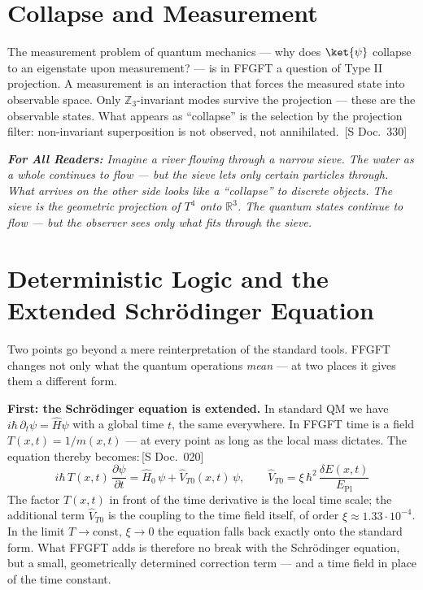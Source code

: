 \documentclass[11pt,oneside]{book}
\newcommand{\status}[1]{\penalty10000\,{\scriptsize\textcolor{gray!60}{[#1]}}}
\newenvironment{laierspur}{%
  \par\vspace{4pt}%
  \noindent\small\itshape\color{blue!60!black}%
  \textbf{For All Readers:}\enspace\ignorespaces}{%
  \par\vspace{4pt}\normalsize\normalfont\normalcolor}
\begin{document}
\section*{Collapse and Measurement}

The measurement problem of quantum mechanics — why does $\ket{\psi}$ collapse
to an eigenstate upon measurement? — is in FFGFT a question of Type II
projection. A measurement is an interaction that forces the measured state
into observable space. Only $\mathbb{Z}_3$-invariant modes survive the projection —
these are the observable states. What appears as \enquote{collapse} is the selection
by the projection filter: non-invariant superposition is not observed, not
annihilated. \status{S Doc.~330}

\begin{laierspur}
Imagine a river flowing through a narrow sieve. The water as a whole
continues to flow — but the sieve lets only certain particles through. What
arrives on the other side looks like a \enquote{collapse} to discrete objects. The
sieve is the geometric projection of $T^4$ onto $\mathbb{R}^3$. The quantum states
continue to flow — but the observer sees only what fits through the sieve.
\end{laierspur}

\section*{Deterministic Logic and the Extended Schrödinger Equation}

Two points go beyond a mere reinterpretation of the standard tools.
FFGFT changes not only what the quantum operations \textit{mean} ---
at two places it gives them a different form.

\textbf{First: the Schrödinger equation is extended.}
In standard QM we have $i\hbar\,\partial_t\psi = \hat{H}\psi$ with a
global time $t$, the same everywhere. In FFGFT time is a field
$T(x,t) = 1/m(x,t)$ --- at every point as long as the local mass dictates.
The equation thereby becomes:\status{S Doc.~020}
\[
  i\hbar\, T(x,t)\,\frac{\partial\psi}{\partial t}
  = \hat{H}_0\,\psi + \hat{V}_{T0}(x,t)\,\psi,
  \qquad
  \hat{V}_{T0} = \xi\,\hbar^2\,\frac{\delta E(x,t)}{E_{\mathrm{Pl}}}
\]
The factor $T(x,t)$ in front of the time derivative is the local time
scale; the additional term $\hat{V}_{T0}$ is the coupling to the time
field itself, of order $\xi \approx 1.33\cdot 10^{-4}$. In the limit
$T \to \mathrm{const}$, $\xi \to 0$ the equation falls back exactly onto
the standard form. What FFGFT adds is therefore no break with the
Schrödinger equation, but a small, geometrically determined correction
term --- and a time field in place of the time constant.
\end{document}
